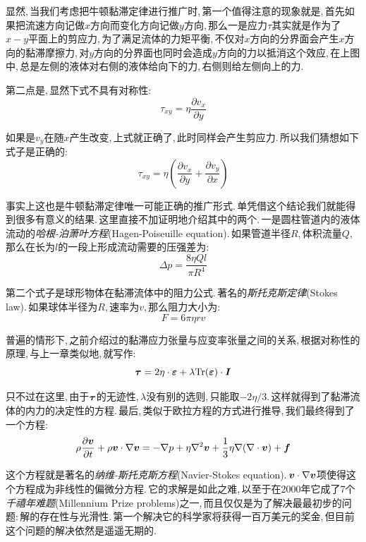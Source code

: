 显然,\,当我们考虑把牛顿黏滞定律进行推广时,\,第一个值得注意的现象就是,\,首先如果把流速方向记做$x$方向而变化方向记做$y$方向,\,那么一是应力$\tau$其实就是作为了$x-y$平面上的剪应力,\,为了满足流体的力矩平衡,\,不仅对$x$方向的分界面会产生$x$方向的黏滞摩擦力,\,对$y$方向的分界面也同时会造成$y$方向的力以抵消这个效应,\,在上图中,\,总是左侧的液体对右侧的液体给向下的力,\,右侧则给左侧向上的力.

第二点是,\,显然下式不具有对称性:
\[\tau_{xy}=\eta\frac{\partial v_x}{\partial y}\]

如果是$v_y$在随$x$产生改变,\,上式就正确了,\,此时同样会产生剪应力.\,所以我们猜想如下式子是正确的:
\[\tau_{xy}=\eta\left(\frac{\partial v_x}{\partial y}+\frac{\partial v_y}{\partial x}\right)\]

事实上这也是牛顿黏滞定律唯一可能正确的推广形式.\,单凭借这个结论我们就能得到很多有意义的结果.\,这里直接不加证明地介绍其中的两个.\,一是圆柱管道内的液体流动的\emph{哈根-泊萧叶方程}(Hagen-Poiseuille equation).\,如果管道半径$R$,\,体积流量$Q$,\,那么在长为$l$的一段上形成流动需要的压强差为:
\[\Delta p=\frac{8\eta Ql}{\pi R^4}\]

第二个式子是球形物体在黏滞流体中的阻力公式.\,著名的\emph{斯托克斯定律}(Stokes law).\,如果球体半径为$R$,\,速率为$v$,\,那么阻力大小为:
\[F=6\pi\eta rv\]

普遍的情形下,\,之前介绍过的黏滞应力张量与应变率张量之间的关系,\,根据对称性的原理,\,与上一章类似地,\,就写作:
\[\boldsymbol{\tau}=2\eta\cdot \boldsymbol{\varepsilon}+\lambda {\rm Tr}(\boldsymbol{\varepsilon})\cdot \boldsymbol{I}\]

只不过在这里,\,由于$\boldsymbol{\tau}$的无迹性,\,$\lambda$没有别的选则,\,只能取$-2\eta/3$.\,这样就得到了黏滞流体的内力的决定性的方程.\,最后,\,类似于欧拉方程的方式进行推导,\,我们最终得到了一个方程:
\[\rho\frac{\partial \boldsymbol{v}}{\partial t}+\rho\boldsymbol{v}\cdot\nabla\boldsymbol{v}=-\nabla p+\eta\nabla^2\boldsymbol{v}+\frac{1}{3}\eta\nabla(\nabla\cdot\boldsymbol{v})+\boldsymbol{f}\]

这个方程就是著名的\emph{纳维-斯托克斯方程}(Navier-Stokes equation).\,$\boldsymbol{v}\cdot\nabla\boldsymbol{v}$项使得这个方程成为非线性的偏微分方程.\,它的求解是如此之难,\,以至于在2000年它成了7个\emph{千禧年难题}(Millennium Prize problems)之一,\,而且仅仅是为了解决最最初步的问题:\,解的存在性与光滑性.\,第一个解决它的科学家将获得一百万美元的奖金,\,但目前这个问题的解决依然是遥遥无期的.





